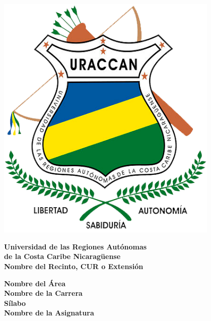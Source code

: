 \begin{titlepage}
    \noindent
    \begin{minipage}{0.2\textwidth}
        \begin{center}
            \includegraphics[width=0.8\textwidth]{images/uraccan_logo.png}
        \end{center}
    \end{minipage}%
    \begin{minipage}{0.8\textwidth}
        \begin{center}
            \Large{\textbf{Universidad de las Regiones Autónomas\\de la Costa Caribe Nicaragüense}}\\
            \vspace{0.2cm}
            \Large{\textbf{Nombre del Recinto, CUR o Extensión}}\\
        \end{center}
    \end{minipage}

    \begin{center}
        \vspace{2cm}
        \large{\textbf{Nombre del Área}}\\
        \large{\textbf{Nombre de la Carrera}}\\

        \vspace{3cm}
        \large{\textbf{Sílabo}}\\
        \Huge{\textbf{Nombre de la Asignatura}}\\


\end{center}
\end{titlepage}
